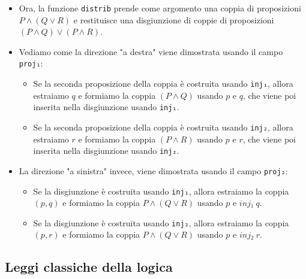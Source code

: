 \documentclass[a4paper]{article}
\theoremstyle{definition}
\theoremstyle{remark}
\begin{document}
\begin{itemize}
  \item Ora, la funzione \texttt{distrib} prende come argomento una coppia di proposizioni \( P ∧ (Q ∨ R) \) e restituisce una disgiunzione di coppie di proposizioni \( (P ∧ Q) ∨ (P ∧ R) \).
  \item Vediamo come la direzione "a destra" viene dimostrata usando il campo \texttt{proj₁}:
    \begin{itemize}
      \item Se la seconda proposizione della coppia è costruita usando \texttt{inj₁}, allora estraiamo \( q \) e formiamo la coppia \( (P ∧ Q) \) usando \( p \) e \( q \), che viene poi inserita nella disgiunzione usando \texttt{inj₁}.
      \item Se la seconda proposizione della coppia è costruita usando \texttt{inj₂}, allora estraiamo \( r \) e formiamo la coppia \( (P ∧ R) \) usando \( p \) e \( r \), che viene poi inserita nella disgiunzione usando \texttt{inj₂}.
    \end{itemize}
  \item La direzione "a sinistra" invece, viene dimostrata usando il campo \texttt{proj₂}:
    \begin{itemize}
      \item Se la disgiunzione è costruita usando \texttt{inj₁}, allora estraiamo la coppia \( (p , q) \) e formiamo la coppia \( P ∧ (Q ∨ R) \) usando \( p \) e \( inj₁ \; q \).
      \item Se la disgiunzione è costruita usando \texttt{inj₂}, allora estraiamo la coppia \( (p , r) \) e formiamo la coppia \( P ∧ (Q ∨ R) \) usando \( p \) e \( inj₂ \; r \).
    \end{itemize}
\end{itemize}

\subsection{Leggi classiche della logica}
\end{document}
